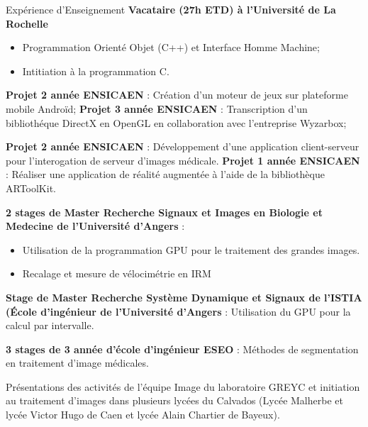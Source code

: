 \begin{rubric}{Expérience d'Enseignement}
  \entry*[2003-2004]
  \textbf{Vacataire (27h ETD) à l'Université de La Rochelle}
  \begin{itemize}
  \item Programmation Orienté Objet (C++) et Interface Homme Machine;
  \item Intitiation à la programmation C.
  \end{itemize}

  \entry*[2010-2011]
  \textbf{Projet 2 année ENSICAEN} : Création d'un moteur de jeux sur plateforme mobile Androïd;
  \textbf{Projet 3 année ENSICAEN} : Transcription d'un bibliothéque DirectX en OpenGL en collaboration avec l'entreprise Wyzarbox;


  \entry*[2009-2010]
  \textbf{Projet 2 année ENSICAEN} : Développement d'une application client-serveur pour l'interogation de serveur d'images médicale.
  \entry*[2009-2010]
  \textbf{Projet 1 année ENSICAEN} : Réaliser une application
  de réalité augmentée à l'aide de la bibliothèque ARToolKit.

  \entry*[03-08/2009]
  \textbf{2 stages de Master Recherche Signaux et Images en Biologie et Medecine de l'Université d'Angers} : 
  \begin{itemize}
  \item Utilisation de la programmation GPU pour le traitement des grandes images.
  \item Recalage et mesure de vélocimétrie en IRM
  \end{itemize}

  \entry*[03-08/2009]
  \textbf{Stage de Master Recherche Système Dynamique et Signaux  de l'ISTIA (\'Ecole d'ingénieur de l'Université d'Angers} : Utilisation du GPU pour la calcul par intervalle.

  \entry*[2005-2008]
  \textbf{3 stages de 3 année d'école d'ingénieur ESEO} : Méthodes de segmentation en traitement d'image médicales.


  \entry*[2009-2010]
  Présentations des activités de l'équipe Image du laboratoire GREYC et
  initiation au traitement d'images dans plusieurs lycées du Calvados
  (Lycée Malherbe et lycée Victor Hugo de Caen et lycée Alain Chartier de Bayeux).

\end{rubric}
